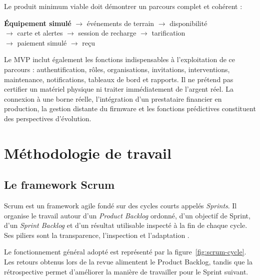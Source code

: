 Le produit minimum viable doit démontrer un parcours complet et cohérent :

\begin{center}
  \begin{tcolorbox}[
    width=0.96\textwidth,
    colback=ctpaper,
    colframe=ctline,
    boxrule=0.7pt,
    arc=2mm,
    halign=center
  ]
    \textbf{Équipement simulé}
    $\rightarrow$ événements de terrain
    $\rightarrow$ disponibilité\\[1mm]
    $\rightarrow$ carte et alertes
    $\rightarrow$ session de recharge
    $\rightarrow$ tarification\\[1mm]
    $\rightarrow$ paiement simulé
    $\rightarrow$ reçu
  \end{tcolorbox}
\end{center}

Le MVP inclut également les fonctions indispensables à l'exploitation de ce parcours :
authentification, rôles, organisations, invitations, interventions, maintenance,
notifications, tableaux de bord et rapports. Il ne prétend pas certifier un matériel
physique ni traiter immédiatement de l'argent réel. La connexion à une borne réelle,
l'intégration d'un prestataire financier en production, la gestion distante du
firmware et les fonctions prédictives constituent des perspectives d'évolution.

\section{Méthodologie de travail}

\subsection{Le framework Scrum}

Scrum est un framework agile fondé sur des cycles courts appelés \emph{Sprints}. Il
organise le travail autour d'un \emph{Product Backlog} ordonné, d'un objectif de
Sprint, d'un \emph{Sprint Backlog} et d'un résultat utilisable inspecté à la fin de
chaque cycle. Ses piliers sont la transparence, l'inspection et l'adaptation
\cite{scrumGuide2020}.

Le fonctionnement général adopté est représenté par la
figure~\ref{fig:scrum-cycle}. Les retours obtenus lors de la revue alimentent le
Product Backlog, tandis que la rétrospective permet d'améliorer la manière de
travailler pour le Sprint suivant.

